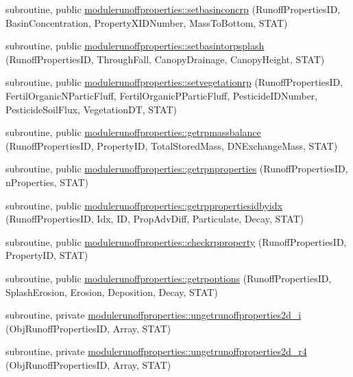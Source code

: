 \begin{DoxyCompactItemize}
\item 
subroutine, public \mbox{\hyperlink{namespacemodulerunoffproperties_a5a59647a877b86974489e072330e3b92}{modulerunoffproperties\+::setbasinconcrp}} (Runoff\+Properties\+ID, Basin\+Concentration, Property\+X\+I\+D\+Number, Mass\+To\+Bottom, S\+T\+AT)
\item 
subroutine, public \mbox{\hyperlink{namespacemodulerunoffproperties_a38a9e34b9711a489d98165b72541a7b6}{modulerunoffproperties\+::setbasintorpsplash}} (Runoff\+Properties\+ID, Through\+Fall, Canopy\+Drainage, Canopy\+Height, S\+T\+AT)
\item 
subroutine, public \mbox{\hyperlink{namespacemodulerunoffproperties_a63a750ecc17b3e0301717d8bc71858f2}{modulerunoffproperties\+::setvegetationrp}} (Runoff\+Properties\+ID, Fertil\+Organic\+N\+Partic\+Fluff, Fertil\+Organic\+P\+Partic\+Fluff, Pesticide\+I\+D\+Number, Pesticide\+Soil\+Flux, Vegetation\+DT, S\+T\+AT)
\item 
subroutine, public \mbox{\hyperlink{namespacemodulerunoffproperties_a9588522d88fead0d0a355bc1c32062b9}{modulerunoffproperties\+::getrpmassbalance}} (Runoff\+Properties\+ID, Property\+ID, Total\+Stored\+Mass, D\+N\+Exchange\+Mass, S\+T\+AT)
\item 
subroutine, public \mbox{\hyperlink{namespacemodulerunoffproperties_a4e8dd453019d74193b19d83465d41e85}{modulerunoffproperties\+::getrpnproperties}} (Runoff\+Properties\+ID, n\+Properties, S\+T\+AT)
\item 
subroutine, public \mbox{\hyperlink{namespacemodulerunoffproperties_a99e35b0a7f1f65083cde0db46427a9df}{modulerunoffproperties\+::getrppropertiesidbyidx}} (Runoff\+Properties\+ID, Idx, ID, Prop\+Adv\+Diff, Particulate, Decay, S\+T\+AT)
\item 
subroutine, public \mbox{\hyperlink{namespacemodulerunoffproperties_a2c0e22dfe3b09a4715eaf763f273241b}{modulerunoffproperties\+::checkrpproperty}} (Runoff\+Properties\+ID, Property\+ID, S\+T\+AT)
\item 
subroutine, public \mbox{\hyperlink{namespacemodulerunoffproperties_ad5669badf377e3cc3ab36dd0f775f5fa}{modulerunoffproperties\+::getrpoptions}} (Runoff\+Properties\+ID, Splash\+Erosion, Erosion, Deposition, Decay, S\+T\+AT)
\item 
subroutine, private \mbox{\hyperlink{namespacemodulerunoffproperties_af2f8fff6028d006b30f2d2c823a5e384}{modulerunoffproperties\+::ungetrunoffproperties2d\+\_\+i}} (Obj\+Runoff\+Properties\+ID, Array, S\+T\+AT)
\item 
subroutine, private \mbox{\hyperlink{namespacemodulerunoffproperties_a85270cee7ca1e6d07d2853a9380f1987}{modulerunoffproperties\+::ungetrunoffproperties2d\+\_\+r4}} (Obj\+Runoff\+Properties\+ID, Array, S\+T\+AT)

\end{DoxyCompactItemize}
